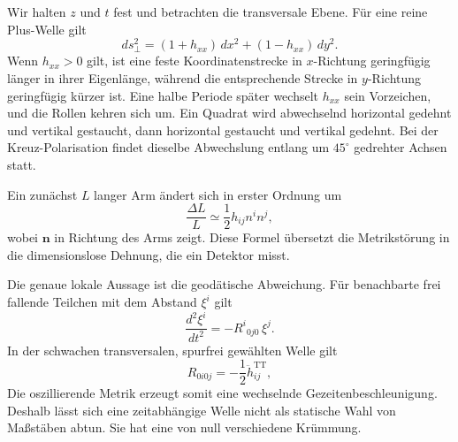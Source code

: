 Wir halten \(z\) und \(t\) fest und betrachten die transversale Ebene. Für eine reine Plus-Welle gilt
\begin{equation}
 ds_\perp^2
 =(1+h_{xx})\,dx^2+(1-h_{xx})\,dy^2.
 \label{eq:transverse-distance}
\end{equation}
Wenn \(h_{xx}>0\) gilt, ist eine feste Koordinatenstrecke in \(x\)-Richtung geringfügig länger in ihrer Eigenlänge, während die entsprechende Strecke in \(y\)-Richtung geringfügig kürzer ist. Eine halbe Periode später wechselt \(h_{xx}\) sein Vorzeichen, und die Rollen kehren sich um. Ein Quadrat wird abwechselnd horizontal gedehnt und vertikal gestaucht, dann horizontal gestaucht und vertikal gedehnt. Bei der Kreuz-Polarisation findet dieselbe Abwechslung entlang um \(45^\circ\) gedrehter Achsen statt.

Ein zunächst \(L\) langer Arm ändert sich in erster Ordnung um
\begin{equation}
 \frac{\Delta L}{L}\simeq\frac12 h_{ij}n^i n^j,
 \label{eq:fractional-strain}
\end{equation}
wobei \(\mathbf n\) in Richtung des Arms zeigt. Diese Formel übersetzt die Metrikstörung in die dimensionslose Dehnung, die ein Detektor misst.

\begin{classroomqa}
\end{classroomqa}

Die genaue lokale Aussage ist die geodätische Abweichung. Für benachbarte frei fallende Teilchen mit dem Abstand \(\xi^i\) gilt
\begin{equation}
 \frac{d^2\xi^i}{dt^2}
 =-R^i{}_{0j0}\,\xi^j.
 \label{eq:geodesic-deviation}
\end{equation}
In der schwachen transversalen, spurfrei gewählten Welle gilt
\begin{equation}
 R_{0i0j}=-\frac12\ddot h^{\mathrm{TT}}_{ij},
 \label{eq:tidal-curvature}
\end{equation}
Die oszillierende Metrik erzeugt somit eine wechselnde Gezeitenbeschleunigung. Deshalb lässt sich eine zeitabhängige Welle nicht als statische Wahl von Maßstäben abtun. Sie hat eine von null verschiedene Krümmung.

